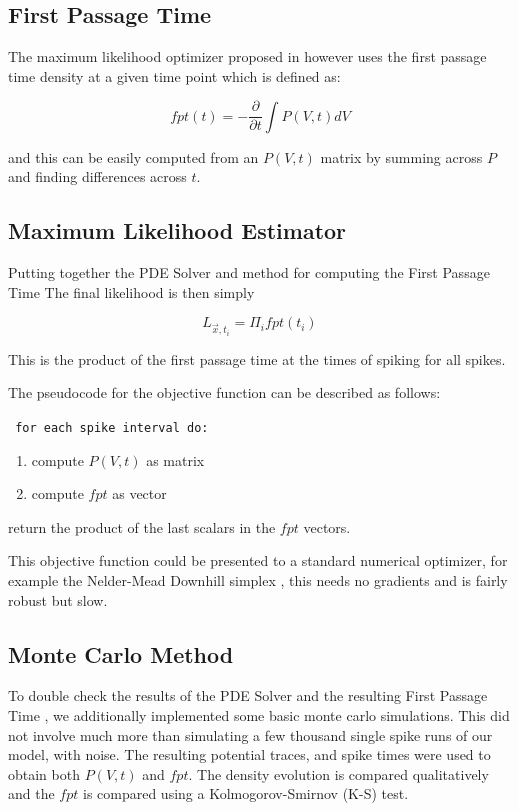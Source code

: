 \documentclass[10pt]{article}
\begin{document}
\subsection{First Passage Time}

The maximum likelihood optimizer proposed in
\cite{PaninskiPillowSimoncelli} however uses the first passage time
density at a given time point which is defined as:

\begin{equation}
    fpt(t) = -\frac{\partial}{\partial t} \int P(V,t)dV
\end{equation}

and this can be easily computed from an $P(V,t)$ matrix by summing
across $P$ and finding differences across $t$.

\subsection{Maximum Likelihood Estimator}

Putting together the PDE Solver and method for computing the First
Passage Time 
The final likelihood is then simply

\begin{equation}
    L_{\vec{x},t_{i}} = \Pi_{i} fpt(t_{i})
\end{equation}

This is the product of the first passage time at the times of
spiking for all spikes.

The pseudocode for the objective function can be described as follows:

{\tt
for each spike interval do:
\begin{enumerate}
    \item compute $P(V,t)$ as matrix
    \item compute $fpt$ as vector
\end{enumerate}
return the product of the last scalars in the $fpt$ vectors.}

This objective function could be presented to a standard numerical
optimizer, for example the Nelder-Mead Downhill simplex \cite{press},
this needs no gradients and is fairly robust but slow.

\subsection{Monte Carlo Method}

To double check the results of the PDE Solver and the resulting First
Passage Time , we additionally implemented some basic monte carlo
simulations. This did not involve much more than simulating a few
thousand single spike runs of our model, with noise. The resulting
potential traces, and spike times were used to obtain both $P(V,t)$
and $fpt$. The density evolution is compared qualitatively and the
$fpt$ is compared using a Kolmogorov-Smirnov (K-S) test\cite{press}.
\end{document}
